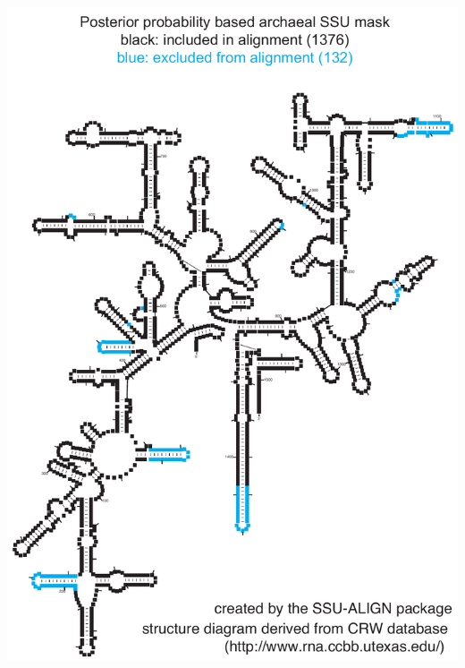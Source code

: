 \documentclass[landscape]{slides}
\begin{document}
\begin{slide}
\begin{center}
\includegraphics[height=8in]{figs/archaea-mask-pp-only}
\end{center}
\vfill
\end{slide}
\end{document}
